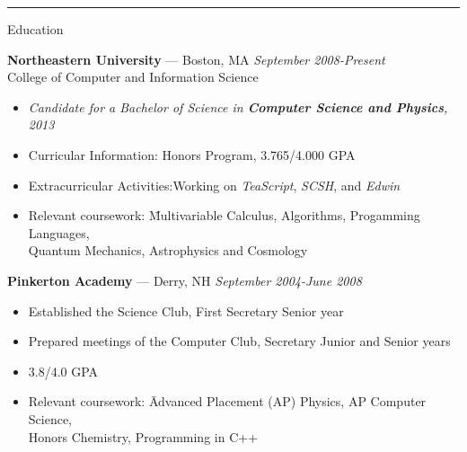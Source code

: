 \documentclass[10pt]{letter}
\begin{document}
\rule{\linewidth}{.5pt}

{\Large Education}
\begin{tabbing}
{\large \bf Northeastern University} --- Boston, MA \` \textit{September 2008-Present} \\
College of Computer and Information Science
\end{tabbing}\vspace{-15pt}

\begin{itemize}
\setlength\itemsep{1pt}
\item[] \textit{Candidate for a Bachelor of Science in \textbf{Computer Science and Physics}, 2013}
\item Curricular Information:\hspace{.355in} Honors Program, 3.765/4.000 GPA
\item Extracurricular Activities:\hspace{.245in}Working on \textit{TeaScript}, \textit{SCSH}, and \textit{Edwin}
\item \begin{tabbing}Relevant coursework:\hspace{.5in} \= Multivariable Calculus, Algorithms, Progamming Languages, \\
  \>Quantum Mechanics, Astrophysics and Cosmology\end{tabbing}
\end{itemize}

\begin{tabbing}
{\large \bf Pinkerton Academy} --- Derry, NH \` \textit{September 2004-June 2008}
\end{tabbing}\vspace{-15pt}
\begin{itemize}
\setlength\itemsep{1pt}
\item Established the Science Club, First Secretary Senior year
\item Prepared meetings of the Computer Club, Secretary Junior and Senior years
\item 3.8/4.0 GPA
\item \begin{tabbing}Relevant coursework:\hspace{.5in} \= Advanced Placement (AP) Physics, AP Computer Science,\\
	\> Honors Chemistry, Programming in C++\end{tabbing}
\end{itemize}\vspace{-15pt}
\end{document}
